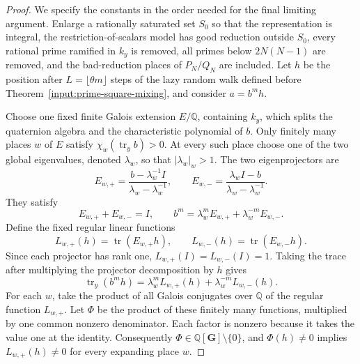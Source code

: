 \documentclass[11pt,reqno]{amsart}
\theoremstyle{definition}
\theoremstyle{remark}
\newcommand{\Q}{\mathbb Q}
\newcommand{\Tr}{\operatorname{tr}}
\begin{document}
\begin{proof}
We specify the constants in the order needed for the final limiting
argument.  Enlarge a rationally saturated set \(S_0\) so that
the representation is integral, the restriction-of-scalars model has good
reduction outside \(S_0\), every rational prime ramified in \(k_y\) is
removed, all primes below \(2N(N-1)\) are removed, and the bad-reduction
places of \(P_N/Q_N\) are included.
Let \(h\) be the position after \(L=\lfloor\theta m\rfloor\) steps of the
lazy random walk defined before
Theorem~\ref{input:prime-square-mixing}, and consider \(a=b^mh\).

Choose one fixed finite Galois extension \(E/\Q\), containing \(k_y\),
which splits the quaternion algebra and the characteristic polynomial of
\(b\).  Only
finitely many places \(w\) of \(E\) satisfy
\(\chi_w(\Tr_y b)>0\).  At every such place choose one of the two global
eigenvalues, denoted \(\lambda_w\), so that \(|\lambda_w|_w>1\).  The
two eigenprojectors are
\[
 E_{w,+}=\frac{b-\lambda_w^{-1}I}{\lambda_w-\lambda_w^{-1}},
 \qquad
 E_{w,-}=\frac{\lambda_w I-b}{\lambda_w-\lambda_w^{-1}}.
\]
They satisfy
\[
 E_{w,+}+E_{w,-}=I,
 \qquad
 b^m=\lambda_w^mE_{w,+}+\lambda_w^{-m}E_{w,-}.
\]
Define the fixed regular linear functions
\[
 L_{w,+}(h)=\Tr(E_{w,+}h),\qquad
 L_{w,-}(h)=\Tr(E_{w,-}h).
\]
Since each projector has rank one, \(L_{w,+}(I)=L_{w,-}(I)=1\).  Taking the
trace after multiplying the projector decomposition by \(h\) gives
\begin{equation}\label{eq:eigen-coefficients}
 \Tr_y(b^mh)=\lambda_w^mL_{w,+}(h)
              +\lambda_w^{-m}L_{w,-}(h).
\end{equation}
For each \(w\), take the product of all Galois conjugates over \(\Q\) of
the regular function \(L_{w,+}\).  Let \(\Phi\) be the product of these
finitely many functions, multiplied by one common nonzero denominator.
Each factor is nonzero because it takes the value one at the identity.
Consequently \(\Phi\in\Q[\mathbf G]\setminus\{0\}\), and
\(\Phi(h)\ne0\) implies \(L_{w,+}(h)\ne0\) for every expanding place
\(w\).


\end{proof}
\end{document}

